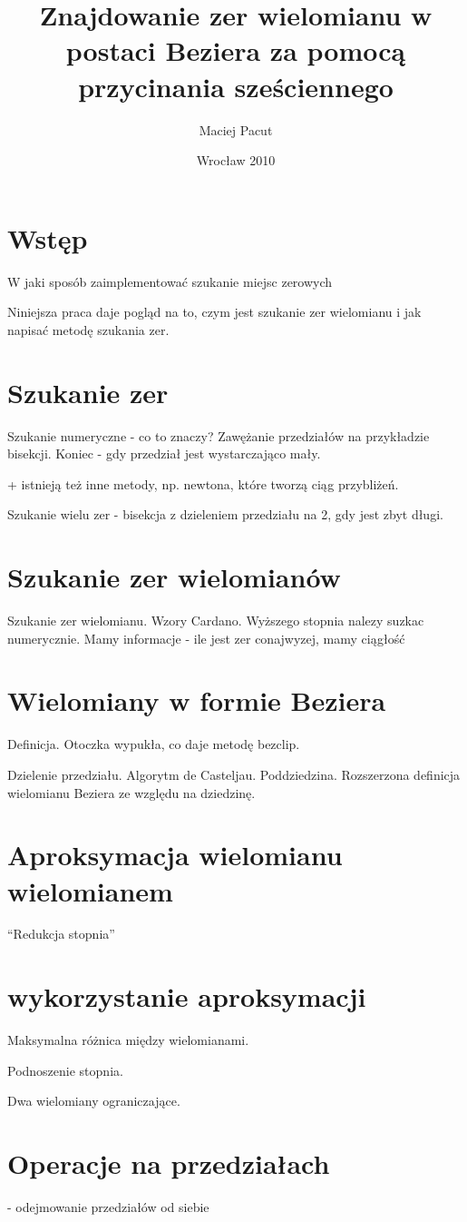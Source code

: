 \documentclass[11pt,a4paper,oneside]{report}
\title{Znajdowanie zer wielomianu w postaci Beziera za pomocą przycinania sześciennego}
\author{Maciej Pacut}
\date{Wrocław 2010}
\begin{document}
\maketitle
\newpage

\section{Wstęp}

W jaki sposób zaimplementować szukanie miejsc zerowych

Niniejsza praca daje pogląd na to, czym jest szukanie zer wielomianu i jak napisać metodę szukania zer.

\section{Szukanie zer}

Szukanie numeryczne - co to znaczy? Zawężanie przedziałów na przykładzie bisekcji. Koniec - gdy przedział jest wystarczająco mały.

+ istnieją też inne metody, np. newtona, które tworzą ciąg przybliżeń.

Szukanie wielu zer - bisekcja z dzieleniem przedziału na 2, gdy jest zbyt długi.

\section{Szukanie zer wielomianów}

Szukanie zer wielomianu. Wzory Cardano. Wyższego stopnia nalezy suzkac numerycznie. Mamy informacje - ile jest zer conajwyzej, mamy ciągłość

\section{Wielomiany w formie Beziera}

Definicja. Otoczka wypukła, co daje metodę bezclip.

Dzielenie przedziału. Algorytm de Casteljau. Poddziedzina. Rozszerzona definicja wielomianu Beziera ze względu na dziedzinę.

\section{Aproksymacja wielomianu wielomianem}

``Redukcja stopnia''

\section{wykorzystanie aproksymacji}

Maksymalna różnica między wielomianami.

Podnoszenie stopnia.

Dwa wielomiany ograniczające.

\section{Operacje na przedziałach}

- odejmowanie przedziałów od siebie
\end{document}
